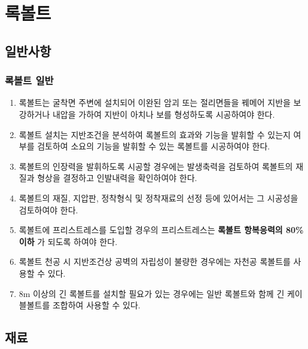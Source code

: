 %
%
%
\newpage
\section{록볼트}

\subsection{일반사항}

\subsubsection{록볼트 일반}
\begin{enumerate}
\item  록볼트는 굴착면 주변에 설치되어 이완된 암괴 또는 절리면들을 꿰메어 지반을 보강하거나 내압을 가하여 지반이 아치나 보를 
       형성하도록 시공하여야 한다.  
\item  록볼트 설치는 지반조건을 분석하여 록볼트의 효과와 기능을 발휘할 수 있는지 여부를 검토하여 소요의 기능을 발휘할 수 있는 
       록볼트를 시공하여야 한다.  
\item  록볼트의 인장력을 발휘하도록 시공할 경우에는 발생축력을 검토하여 록볼트의 재질과 형상을 결정하고 인발내력을 확인하여야 한다.  
\item  록볼트의 재질, 지압판, 정착형식 및 정착재료의 선정 등에 있어서는 그 시공성을 검토하여야 한다.  
\item  록볼트에 프리스트레스를 도입할 경우의 프리스트레스는 \textbf {록볼트 항복응력의 80\% 이하} 
       가 되도록 하여야 한다.  
\item  록볼트 천공 시 지반조건상 공벽의 자립성이 불량한 경우에는 자천공 록볼트를 사용할 수 있다.  
\item  8m 이상의 긴 록볼트를 설치할 필요가 있는 경우에는 일반 록볼트와 함께 긴 케이블볼트를 조합하여 사용할 수 있다.  
\end{enumerate}

\subsection{재료}

